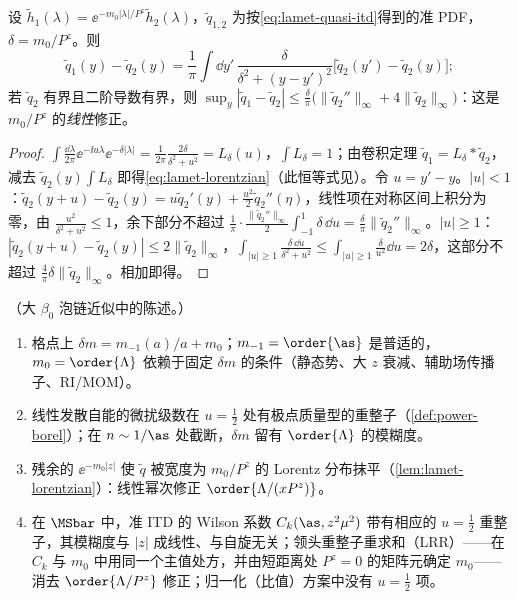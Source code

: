 \begin{lemma}\label{lem:lamet-lorentzian}
设 $\tilde h_1(\lambda)=\ee^{-m_0|\lambda|/P^z}\tilde h_2(\lambda)$，$\tilde q_{1,2}$ 为按\cref{eq:lamet-quasi-itd}得到的准 PDF，$\delta=m_0/P^z$。则
\begin{equation}\label{eq:lamet-lorentzian}
\tilde q_1(y)-\tilde q_2(y)=\frac1\pi\int\dd y'\,\frac{\delta}{\delta^2+(y-y')^2}\big[\tilde q_2(y')-\tilde q_2(y)\big];
\end{equation}
若 $\tilde q_2$ 有界且二阶导数有界，则 $\sup_y|\tilde q_1-\tilde q_2|\le\frac\delta\pi\big(\|\tilde q_2''\|_\infty+4\|\tilde q_2\|_\infty\big)$：这是 $m_0/P^z$ 的\emph{线性}修正。
\end{lemma}

\begin{proof}
$\int\frac{\dd\lambda}{2\pi}\ee^{-\ii u\lambda}\ee^{-\delta|\lambda|}=\frac1{2\pi}\frac{2\delta}{\delta^2+u^2}=L_\delta(u)$，$\int L_\delta=1$；由卷积定理 $\tilde q_1=L_\delta*\tilde q_2$，减去 $\tilde q_2(y)\int L_\delta$ 即得\cref{eq:lamet-lorentzian}（此恒等式见\cite{Ji:2020brr}）。令 $u=y'-y$。$|u|<1$：$\tilde q_2(y+u)-\tilde q_2(y)=u\tilde q_2'(y)+\frac{u^2}2\tilde q_2''(\eta)$，线性项在对称区间上积分为零，由 $\frac{u^2}{\delta^2+u^2}\le1$，余下部分不超过 $\frac1\pi\cdot\frac{\|\tilde q_2''\|_\infty}2\int_{-1}^1\delta\,\dd u=\frac\delta\pi\|\tilde q_2''\|_\infty$。$|u|\ge1$：$|\tilde q_2(y+u)-\tilde q_2(y)|\le2\|\tilde q_2\|_\infty$，$\int_{|u|\ge1}\frac{\delta\,\dd u}{\delta^2+u^2}\le\int_{|u|\ge1}\frac{\delta}{u^2}\dd u=2\delta$，这部分不超过 $\frac4\pi\delta\|\tilde q_2\|_\infty$。相加即得。
\end{proof}

\begin{proposition}\label{prop:lamet-lrr}
（大 $\beta_0$ 泡链近似中的陈述。）
\begin{enumerate}[label=(\alph*),leftmargin=2em,itemsep=1pt,topsep=2pt]
\item 格点上 $\delta m=m_{-1}(a)/a+m_0$；$m_{-1}=\order{\as}$ 是普适的，$m_0=\order{\Lambda}$ 依赖于固定 $\delta m$ 的条件（静态势、大 $z$ 衰减、辅助场传播子、RI/MOM）。
\item 线性发散自能的微扰级数在 $u=\frac12$ 处有极点质量型的重整子（\cref{def:power-borel}）；在 $n\sim1/\as$ 处截断，$\delta m$ 留有 $\order{\Lambda}$ 的模糊度。
\item 残余的 $\ee^{-m_0|z|}$ 使 $\tilde q$ 被宽度为 $m_0/P^z$ 的 Lorentz 分布抹平（\cref{lem:lamet-lorentzian}）：线性幂次修正 $\order{\Lambda/(xP^z)}$。
\item 在 $\MSbar$ 中，准 ITD 的 Wilson 系数 $C_k(\as,z^2\mu^2)$ 带有相应的 $u=\frac12$ 重整子，其模糊度与 $|z|$ 成线性、与自旋无关；领头重整子重求和（LRR）——在 $C_k$ 与 $m_0$ 中用同一个主值处方，并由短距离处 $P^z=0$ 的矩阵元确定 $m_0$——消去 $\order{\Lambda/P^z}$ 修正；归一化（比值）方案中没有 $u=\frac12$ 项。
\end{enumerate}
\end{proposition}

